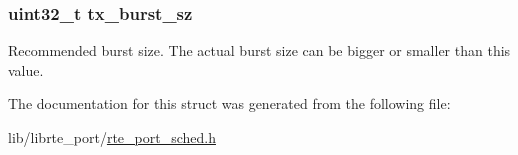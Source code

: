 \subsubsection[{tx\+\_\+burst\+\_\+sz}]{\setlength{\rightskip}{0pt plus 5cm}uint32\+\_\+t tx\+\_\+burst\+\_\+sz}\label{structrte__port__sched__writer__params_a9ed7dbe6241b97c9b68a9491e77c84d0}
Recommended burst size. The actual burst size can be bigger or smaller than this value. 

The documentation for this struct was generated from the following file\+:\begin{DoxyCompactItemize}
\item 
lib/librte\+\_\+port/\hyperlink{rte__port__sched_8h}{rte\+\_\+port\+\_\+sched.\+h}\end{DoxyCompactItemize}
